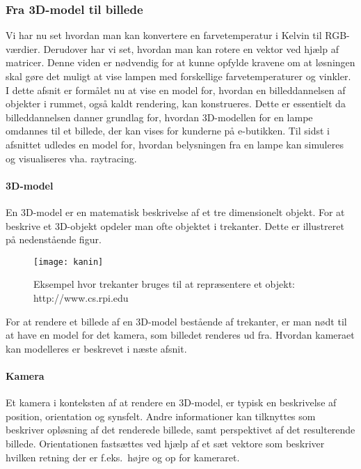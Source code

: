 \subsubsection{Fra 3D-model til billede}
\label{sec:fra_model_til_billede}
Vi har nu set hvordan man kan konvertere en farvetemperatur i Kelvin til RGB-værdier. Derudover har vi set, hvordan man kan rotere en vektor ved hjælp af matricer. Denne viden er nødvendig for at kunne opfylde kravene om at løsningen skal gøre det muligt at vise lampen med forskellige farvetemperaturer og vinkler. I dette afsnit er formålet nu at vise en model for, hvordan en billeddannelsen af objekter i rummet, også kaldt rendering, kan konstrueres. Dette er essentielt da billeddannelsen danner grundlag for, hvordan 3D-modellen for en lampe omdannes til et billede, der kan vises for kunderne på e-butikken. Til sidst i afsnittet udledes en model for, hvordan belysningen fra en lampe kan simuleres og visualiseres vha. raytracing. 

\paragraph{3D-model}
En 3D-model er en matematisk beskrivelse af et tre dimensionelt objekt. For at beskrive et 3D-objekt opdeler man ofte objektet i trekanter. Dette er illustreret på nedenstående figur.

\begin{figure}[H]
\label{fig:kanin}
    \centering
    \texttt{[image: kanin]}
    \caption{Eksempel hvor trekanter bruges til at repræsentere et objekt: http://www.cs.rpi.edu}
\end{figure}

For at rendere et billede af en 3D-model bestående af trekanter, er man nødt til at have en model for det kamera, som billedet renderes ud fra. Hvordan kameraet kan modelleres er beskrevet i næste afsnit.

\paragraph{Kamera}
Et kamera i konteksten af at rendere en 3D-model, er typisk en beskrivelse af position, orientation og synsfelt. Andre informationer kan tilknyttes som beskriver opløsning af det renderede billede, samt perspektivet af det resulterende billede. Orientationen fastsættes ved hjælp af et sæt vektore som beskriver hvilken retning der er f.eks.\ højre og op for kameraret.

